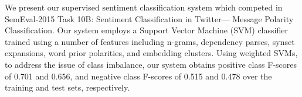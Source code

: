 We present our supervised sentiment classification system which competed in SemEval-2015 Task 10B: Sentiment Classification in Twitter--- Message Polarity Classification. Our system employs a Support Vector Machine (SVM) classifier trained using a number of features including n-grams, dependency parses, synset expansions, word prior polarities, and embedding clusters. Using weighted SVMs, to address the issue of class imbalance, our system obtains positive class F-scores of 0.701 and 0.656, and negative class F-scores of 0.515 and 0.478 over the training and test sets, respectively.
